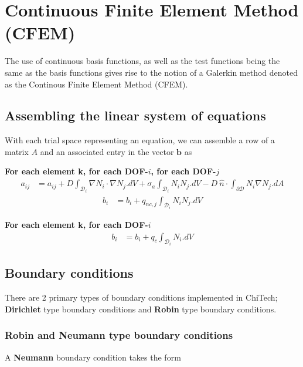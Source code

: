 \documentclass[11pt,letterpaper,titlepage]{article}
\newcommand{\bOmega}{\mathcal{D}}
\numberwithin{equation}{section}
\begin{document}
\newpage
{}
\section{Continuous Finite Element Method (CFEM)}

The use of continuous basis functions, as well as the test functions being the same as the basis functions gives rise to the notion of a Galerkin method denoted as the Continous Finite Element Method (CFEM).

\subsection{Assembling the linear system of equations}
With each trial space representing an equation, we can assemble a row of a matrix $A$ and an associated entry in the vector $\mathbf{b}$ as
 
\vspace{0.25cm}
\textbf{For each element k, for each DOF-$i$, for each DOF-$j$}
\begin{equation}
\begin{aligned}
a_{ij} &=a_{ij} +  D \int_{\bOmega_i} \nabla N_i  \cdot  \nabla N_j .dV + 
\sigma_a \int_{\bOmega_i} N_i N_j.dV -
D \  \hat{n} \cdot \int_{\partial \bOmega} N_i  \nabla N_j .dA 
\end{aligned}
\end{equation}
\begin{equation}
\begin{aligned}
b_i &= b_i 
+ q_{nc,j} \int_{\bOmega_i}  N_i  N_j .dV
\end{aligned}
\end{equation}

\textbf{For each element k, for each DOF-$i$}
\begin{equation}
\begin{aligned}
b_i &= b_i + q_c \int_{\bOmega_i} N_i   .dV 
\end{aligned}
\end{equation}

\subsection{Boundary conditions}
There are 2 primary types of boundary conditions implemented in ChiTech; \textbf{Dirichlet} type boundary conditions and \textbf{Robin} type boundary conditions.

\subsubsection{Robin and Neumann type boundary conditions}
A \textbf{Neumann} boundary condition takes the form
\end{document}
